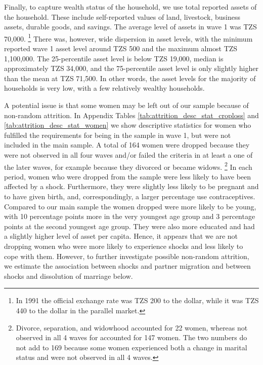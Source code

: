 \documentclass[letterpaper,12pt]{article}
\begin{document}
Finally, to capture wealth status of the household, we use total reported assets of the 
household.
These include self-reported values of land, livestock, business assets, durable
goods, and savings.
The average level of assets in wave 1 was TZS 70,000.%
\footnote{
In 1991 the official exchange rate was TZS 200 to the dollar, while it
was TZS 440 to the dollar in the parallel market.
}
There was, however, wide dispersion in asset levels, with the minimum reported 
wave 1 asset level around TZS 500 and the maximum almost TZS 1,100,000.
The 25-percentile asset level is below TZS 19,000, median is approximately 
TZS 34,000, and the 75-percentile asset level is only slightly higher than the 
mean at TZS 71,500.
In other words, the asset levels for the majority of households is 
very low, with a few relatively wealthy households.

A potential issue is that some women may be left out of our sample because of
non-random attrition.
In Appendix Tables \ref{tab:attrition_desc_stat_croploss} and 
\ref{tab:attrition_desc_stat_women}
we show descriptive statistics for women who fulfilled the requirements for being in the 
sample in wave 1, but were not included in the main sample.
A total of 164 women were dropped because they were not observed in all four waves 
and/or failed the criteria in at least a one of the later waves, for example 
because they divorced or became widows.%
\footnote{
Divorce, separation, and widowhood accounted for 22 women, whereas not observed in all
4 waves for accounted for 147 women. 
The two numbers do not add to 169 because some women experienced both a change
in marital status and were not observed in all 4 waves.
}
In each period, women who were dropped from the sample were less likely to have 
been affected by a shock.
Furthermore, they were slightly less likely to be pregnant and to have given 
birth, and, correspondingly, a larger percentage use contraceptives.
Compared to our main sample the women dropped were more likely to be young,
with 10 percentage points more in the very youngest age group and 3 
percentage points at the second youngest age group.
They were also more educated and had a slightly higher level of asset per capita.
Hence, it appears that we are not dropping women who were more likely to 
experience shocks and less likely to cope with them.
However, to further investigate possible non-random attrition, we 
estimate the association between shocks and partner migration and between
shocks and dissolution of marriage below.
\end{document}
